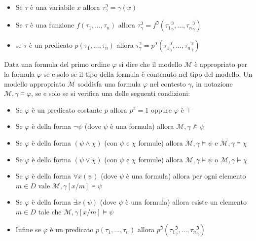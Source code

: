 \documentclass[./main.tex]{subfiles}
\begin{document}
\begin{itemize}
  \item Se $\tau$ è una variabile $x$ allora $\tau^\mathfrak{I}_\gamma = \gamma(x)$
  \item Se $\tau$ è una funzione $f(\tau_1, ..., \tau_n)$ allora $\tau^\mathfrak{I}_\gamma = f^\mathfrak{I}({\tau_1}^\mathfrak{I}_\gamma, ..., {\tau_n}^\mathfrak{I}_\gamma)$
  \item se $\tau$ è un predicato $p(\tau_1, ..., \tau_n)$ allora $\tau^\mathfrak{I}_\gamma = p^\mathfrak{I}({\tau_1}^\mathfrak{I}_\gamma, ..., {\tau_n}^\mathfrak{I}_\gamma)$
\end{itemize}

Data una formula del primo ordine $\varphi$ si dice che il modello $\mathcal{M}$ è appropriato per la formula $\varphi$ se e solo se il tipo della formula è contenuto nel tipo del modello.
Un modello appropriato $\mathcal{M}$ soddisfa una formula $\varphi$ nel contesto $\gamma$, in notazione $\mathcal{M}, \gamma \models \varphi$, se e solo se si verifica una delle seguenti condizioni:
\begin{itemize}
  \item Se $\varphi$ è un predicato costante $p$ allora $p^\mathfrak{I} = 1$ oppure $\varphi$ è $\top$
  \item Se $\varphi$ è della forma $\lnot \psi$ (dove $\psi$ è una formula) allora $\mathcal{M}, \gamma \not\models \psi$
  \item Se $\varphi$ è della forma $(\psi \land \chi)$ (con $\psi$ e $\chi$ formule) allora $\mathcal{M}, \gamma \models \psi$ e $\mathcal{M}, \gamma \models \chi$
  \item Se $\varphi$ è della forma $(\psi \lor \chi)$ (con $\psi$ e $\chi$ formule) allora $\mathcal{M}, \gamma \models \psi$ o $\mathcal{M}, \gamma \models \chi$
  \item Se $\varphi$ è della forma $\forall x (\psi)$ (dove $\psi$ è una formula) allora per ogni elemento $m \in D$ vale $\mathcal{M}, \gamma[x/m] \models \psi$
  \item Se $\varphi$ è della forma $\exists x (\psi)$ (dove $\psi$ è una formula) allora esiste un elemento $m \in D$ tale che $\mathcal{M}, \gamma[x/m] \models \psi$
  \item Infine se $\varphi$ è un predicato $p(\tau_1, ..., \tau_n)$ allora $p^\mathfrak{I}({\tau_1}^\mathfrak{I}_\gamma, ..., {\tau_n}^\mathfrak{I}_\gamma)$
\end{itemize}
\end{document}

